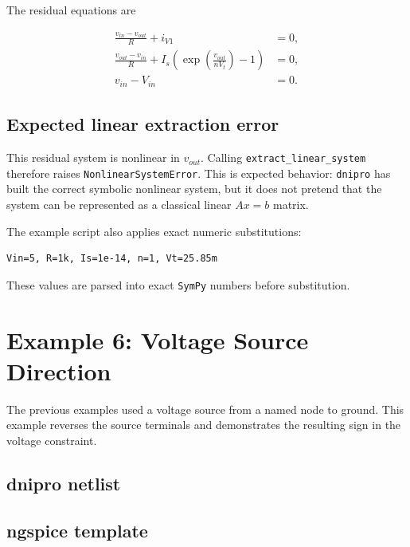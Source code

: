 \documentclass[11pt,a4paper]{article}
\newcommand{\project}{\texttt{dnipro}}
\newcommand{\code}[1]{\texttt{#1}}
\newcommand{\sympy}{\texttt{SymPy}}
\begin{document}
The residual equations are

\begin{align}
    \frac{v_{in}-v_{out}}{R} + i_{V1} &= 0, \\
    \frac{v_{out}-v_{in}}{R}
        + I_s\left(\exp\!\left(\frac{v_{out}}{nV_t}\right)-1\right) &= 0, \\
    v_{in} - V_{in} &= 0.
\end{align}

\subsection{Expected linear extraction error}

This residual system is nonlinear in \(v_{out}\). Calling
\code{extract\_linear\_system} therefore raises \code{NonlinearSystemError}.
This is expected behavior: \project{} has built the correct symbolic nonlinear
system, but it does not pretend that the system can be represented as a
classical linear \(A x=b\) matrix.

The example script also applies exact numeric substitutions:

\begin{lstlisting}[style=textout]
Vin=5, R=1k, Is=1e-14, n=1, Vt=25.85m
\end{lstlisting}

These values are parsed into exact \sympy{} numbers before substitution.

\section{Example 6: Voltage Source Direction}
\label{sec:ex-voltage-source-direction}

The previous examples used a voltage source from a named node to ground. This
example reverses the source terminals and demonstrates the resulting sign in
the voltage constraint.

\subsection{dnipro netlist}



\subsection{ngspice template}
\end{document}

